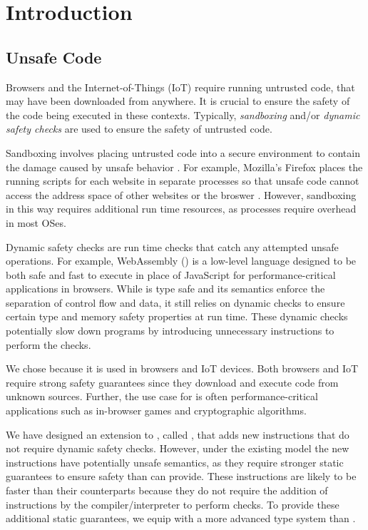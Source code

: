 \chapter{Introduction}
\label{chp:intro}

\section{Unsafe Code}
Browsers and the Internet-of-Things (IoT) require running untrusted code, that may have been downloaded from anywhere.
It is crucial to ensure the safety of the code being executed in these contexts.
Typically, \emph{sandboxing} and/or \emph{dynamic safety checks} are used to ensure the safety of untrusted code.

Sandboxing involves placing untrusted code into a secure environment to contain the damage caused by unsafe behavior \cite{sandboxes}.
For example, Mozilla's Firefox places the running scripts for each website in separate processes so that unsafe code cannot access the address space of other websites or the broswer \cite{foxbox}.
However, sandboxing in this way requires additional run time resources, as processes require overhead in most OSes.

Dynamic safety checks are run time checks that catch any attempted unsafe operations.
For example, WebAssembly (\wasm) is a low-level language designed to be both safe and fast to execute in place of JavaScript for performance-critical applications in browsers.
While \wasm is type safe and its semantics enforce the separation of control flow and data, it still relies on dynamic checks to ensure certain type and memory safety properties at run time.
These dynamic checks potentially slow down programs by introducing unnecessary instructions to perform the checks.

We chose \wasm because it is used in browsers and IoT devices.
Both browsers and IoT require strong safety guarantees since they download and execute code from unknown sources.
Further, the use case for \wasm is often performance-critical applications such as in-browser games and cryptographic algorithms.

We have designed an extension to \wasm, called \name, that adds new instructions that do not require dynamic safety checks.
However, under the existing \wasm model the new \name instructions have potentially unsafe semantics, as they require stronger static guarantees to ensure safety than \wasm can provide.
These instructions are likely to be faster than their \wasm counterparts because they do not require the addition of instructions by the compiler/interpreter to perform checks.
To provide these additional static guarantees, we equip \name with a more advanced type system than \wasm.

